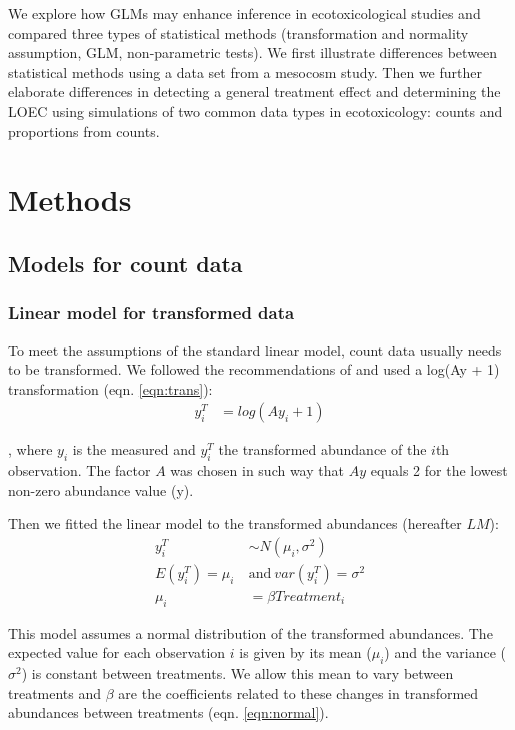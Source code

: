 \documentclass[twocolumn, natbib]{svjour3}
\begin{document}
We explore how GLMs may enhance inference in ecotoxicological studies and compared three types of statistical methods (transformation and normality assumption, GLM, non-parametric tests).
We first illustrate differences between statistical methods using a data set from a mesocosm study.
Then we further elaborate differences in detecting a general treatment effect and determining the LOEC using simulations of two common data types in ecotoxicology: counts and proportions from counts. 



\section{Methods}
\label{sec:methods}

\subsection{Models for count data}
\label{ssec:counts}
\subsubsection{Linear model for transformed data}
To meet the assumptions of the standard linear model, count data usually needs to be transformed. 
We followed the recommendations of \citet{van_den_brink_impact_2000} and used a log(Ay + 1) transformation (eqn. \ref{eqn:trans}):
\begin{align}
  y_i^T & = log(Ay_i + 1) \label{eqn:trans}
\end{align}

, where $y_i$ is the measured and $y_i^T$ the transformed abundance of the $i$th observation. 
The factor $A$ was chosen in such way that $Ay$ equals 2 for the lowest non-zero abundance value (y).

Then we fitted the linear model to the transformed abundances (hereafter $LM$):
\begin{align}
  y_i^T &\sim N(\mu_i, \sigma^2) \nonumber \\
  E(y_i^T) = \mu_i ~&\text{and}~ var(y_i^T) = \sigma^2 \label{eqn:normal} \\
  \mu_i &= \beta Treatment_i  \nonumber
\end{align}

This model assumes a normal distribution of the transformed abundances.
The expected value for each observation $i$ is given by its mean ($\mu_i$) and the variance ($\sigma^2$) is constant between treatments.
We allow this mean to vary between treatments and $\beta$ are the coefficients related to these changes in transformed abundances between treatments (eqn. \ref{eqn:normal}).
\end{document}
